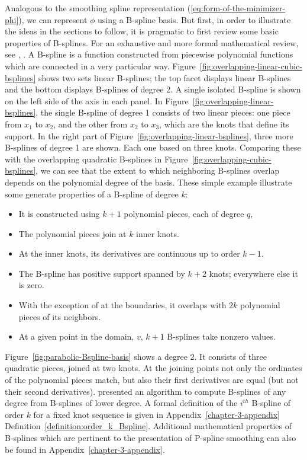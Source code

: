 Analogous to the smoothing spline representation (\ref{eq:form-of-the-minimizer-phi}), we can represent $\phi$ using a B-spline basis. But first, in order to illustrate the ideas in the sections to follow, it is pragmatic to first review some basic properties of B-splines. For an exhaustive and more formal mathematical review, see  \cite{de1978practical}, \cite{dierckx1995curve}. A B-spline is a function constructed from piecewise polynomial functions which are connected in a very particular way.  Figure~\ref{fig:overlapping-linear-cubic-bsplines} shows two sets linear B-splines; the top facet displays linear B-splines and the bottom displays B-splines of degree 2. A single isolated B-spline is shown on the left side of the axis in each panel. In Figure~\ref{fig:overlapping-linear-bsplines}, the single B-spline of degree 1 consists of two linear pieces: one piece from $x_1$ to $x_2$, and the other from $x_2$ to $x_3$, which are the knots that define its support. In the right part of Figure~\ref{fig:overlapping-linear-bsplines}, three more B-splines of degree 1 are shown. Each one based on three knots. Comparing these with the overlapping quadratic B-splines in Figure~\ref{fig:overlapping-cubic-bsplines}, we can see that the extent to which neighboring B-splines overlap depends on the polynomial degree of the basis. These simple example illustrate some generate properties of a B-spline of degree $k$:

\begin{itemize}
\item It is constructed using $k + 1$ polynomial pieces, each of degree $q$,
\item The polynomial pieces join at $k$ inner knots.
\item At the inner knots, its derivatives are continuous up to order $k-1$.
\item The B-spline has positive support spanned by $k + 2$ knots; everywhere else it is zero.
\item With the exception of at the boundaries, it overlaps with $2k$ polynomial pieces of its neighbors.
\item At a given point in the domain, $v$, $k + 1$ B-splines take nonzero values.
\end{itemize}

Figure~\ref{fig:parabolic-Bspline-basis} shows a degree 2. It consists of three quadratic pieces, joined at two knots. At the joining points not only the ordinates of the polynomial pieces match, but also their first derivatives are equal (but not their second derivatives).  \cite{de1978practical} presented an algorithm to compute B-splines of any degree from B-splines of lower degree.  A formal definition of the $i^{th}$ B-spline of order $k$ for a fixed knot sequence is given in Appendix~\ref{chapter-3-appendix} Definition~\ref{definition:order_k_Bspline}. Additional mathematical properties of B-splines which are pertinent to the presentation of P-spline smoothing can also be found in Appendix~\ref{chapter-3-appendix}.

